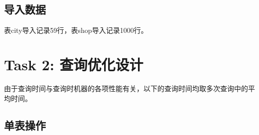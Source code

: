 \documentclass[a4paper, 11pt, nofonts, nocap, fancyhdr]{ctexart}
\begin{document}
\subsection{导入数据}

表city导入记录59行，表shop导入记录1000行。



\section{Task 2: 查询优化设计}

由于查询时间与查询时机器的各项性能有关，以下的查询时间均取多次查询中的平均时间。

\lstset{numbers=none}

\subsection{单表操作}
\end{document}

